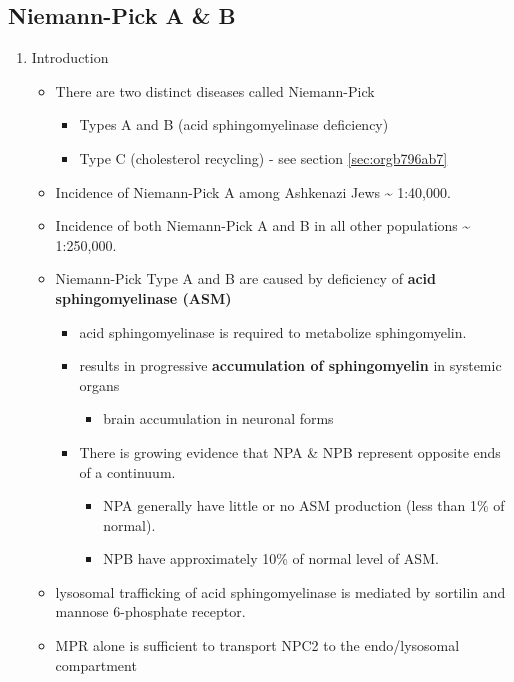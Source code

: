 \documentclass{scrartcl}
\begin{document}
\subsection{Niemann-Pick  A \& B}
\label{sec:org434eb4b}
\begin{enumerate}
\item Introduction
\label{sec:orgcd965d5}
\begin{itemize}
\item There are two distinct diseases called Niemann-Pick
\begin{itemize}
\item Types A and B (acid sphingomyelinase deficiency)
\item Type C (cholesterol recycling) - see section \ref{sec:orgb796ab7}
\end{itemize}

\item Incidence of Niemann-Pick A among Ashkenazi Jews \textasciitilde{} 1:40,000.
\item Incidence of both Niemann-Pick A and B in all other populations \textasciitilde{} 1:250,000.
\item Niemann-Pick Type A and B are caused by deficiency of \textbf{acid sphingomyelinase (ASM)}
\begin{itemize}
\item acid sphingomyelinase is required to metabolize sphingomyelin.
\item results in progressive \textbf{accumulation of sphingomyelin} in systemic organs
\begin{itemize}
\item brain accumulation in neuronal forms
\end{itemize}
\item There is growing evidence that NPA \& NPB represent opposite ends of a continuum.
\begin{itemize}
\item NPA generally have little or no ASM production (less than 1\% of normal).
\item NPB have approximately 10\% of normal level of ASM.
\end{itemize}
\end{itemize}
\item lysosomal trafficking of acid sphingomyelinase is mediated by sortilin and mannose 6-phosphate receptor.
\item MPR alone is sufficient to transport NPC2 to the endo/lysosomal compartment
\end{itemize}



\end{enumerate}
\end{document}
